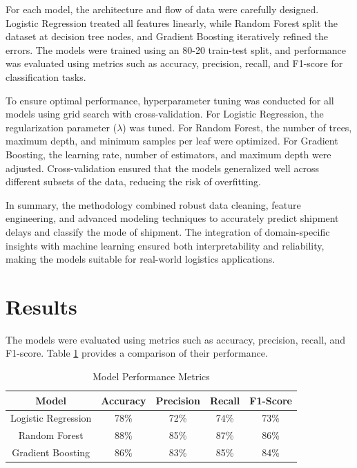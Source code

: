 \documentclass[conference]{IEEEtran}
\begin{document}
For each model, the architecture and flow of data were carefully designed. Logistic Regression treated all features linearly, while Random Forest split the dataset at decision tree nodes, and Gradient Boosting iteratively refined the errors. The models were trained using an 80-20 train-test split, and performance was evaluated using metrics such as accuracy, precision, recall, and F1-score for classification tasks.

To ensure optimal performance, hyperparameter tuning was conducted for all models using grid search with cross-validation. For Logistic Regression, the regularization parameter ($\lambda$) was tuned. For Random Forest, the number of trees, maximum depth, and minimum samples per leaf were optimized. For Gradient Boosting, the learning rate, number of estimators, and maximum depth were adjusted. Cross-validation ensured that the models generalized well across different subsets of the data, reducing the risk of overfitting.

In summary, the methodology combined robust data cleaning, feature engineering, and advanced modeling techniques to accurately predict shipment delays and classify the mode of shipment. The integration of domain-specific insights with machine learning ensured both interpretability and reliability, making the models suitable for real-world logistics applications.

\section{Results}
The models were evaluated using metrics such as accuracy, precision, recall, and F1-score. Table \ref{tab:metrics} provides a comparison of their performance.

\begin{table}[htbp]
\caption{Model Performance Metrics}
\begin{center}
\begin{tabular}{|c|c|c|c|c|}
\hline
\textbf{Model} & \textbf{Accuracy} & \textbf{Precision} & \textbf{Recall} & \textbf{F1-Score} \\
\hline
Logistic Regression & 78\% & 72\% & 74\% & 73\% \\
\hline
Random Forest & 88\% & 85\% & 87\% & 86\% \\
\hline
Gradient Boosting & 86\% & 83\% & 85\% & 84\% \\
\hline
\end{tabular}
\label{tab:metrics}
\end{center}
\end{table}
\end{document}
